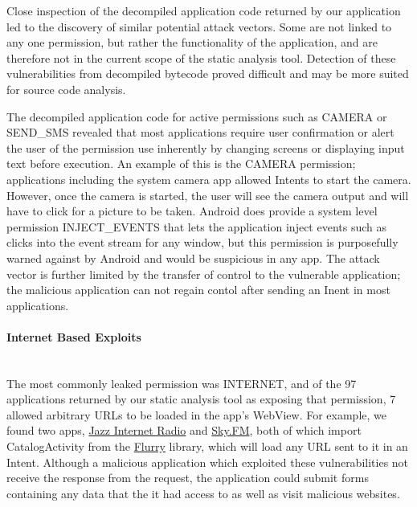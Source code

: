 \documentclass[12pt,a4paper]{article}
\begin{document}
Close inspection of the decompiled application code returned by our application
led to the discovery of similar potential attack vectors. Some are not linked
to any one permission, but rather the functionality of the application, and are
therefore not in the current scope of the static analysis tool. Detection of
these vulnerabilities from decompiled bytecode proved difficult and may be more
suited for source code analysis.

The decompiled application code for active permissions such as CAMERA or\\
SEND\_SMS revealed that most applications require user confirmation or alert the
user of the permission use inherently by changing screens or displaying input
text before execution. An example of this is the CAMERA permission; applications
including the system camera app allowed Intents to start the camera. However,
once the camera is started, the user will see the camera output and will have to
click for a picture to be taken. Android does provide a system level permission
INJECT\_EVENTS that lets the application inject events such as clicks into the
event stream for any window, but this permission is purposefully warned against
by Android and would be suspicious in any app. The attack vector is further
limited by the transfer of control to the vulnerable application; the malicious
application can not regain contol after sending an Inent in most applications.

\paragraph{Internet Based Exploits} ~\\
The most commonly leaked permission was INTERNET, and of the 97 applications
returned by our static analysis tool as exposing that permission, 7 allowed
arbitrary URLs to be loaded in the app's WebView. For example, we found two
apps,
\href{https://play.google.com/store/apps/details?id=com.audioaddict.jr\&feature=search\_result#?t=W251bGwsMSwxLDEsImNvbS5hdWRpb2FkZGljdC5qciJd}{Jazz
  Internet Radio} and
\href{https://play.google.com/store/apps/details?id=com.audioaddict.sky\&feature=search\_result#?t=W251bGwsMSwxLDEsImNvbS5hdWRpb2FkZGljdC5za3kiXQ..}{Sky.FM},
both of which import CatalogActivity from the
\href{http://support.flurry.com/index.php?title=AppCircle/GettingStarted/Android/TechnicalQuickStart}{Flurry}
library, which will load any URL sent to it in an Intent. Although a malicious
application which exploited these vulnerabilities not receive the response from
the request, the application could submit forms containing any data that the it
had access to as well as visit malicious websites.
\end{document}
